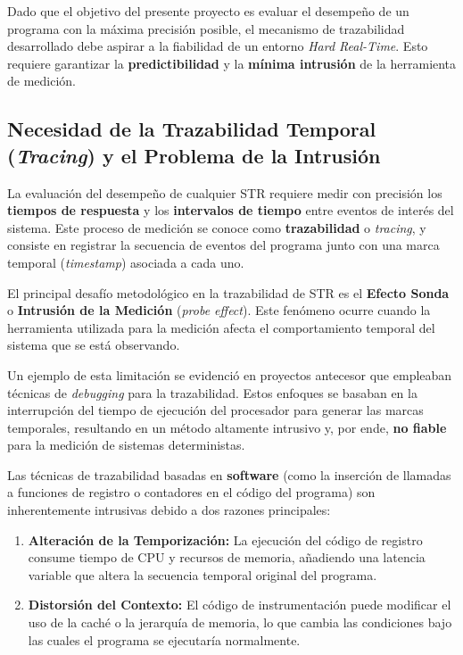 Dado que el objetivo del presente proyecto es evaluar el desempeño de un programa con la máxima precisión posible, el mecanismo de trazabilidad desarrollado debe aspirar a la fiabilidad de un entorno \textit{Hard Real-Time}. Esto requiere garantizar la \textbf{predictibilidad} y la \textbf{mínima intrusión} de la herramienta de medición.


\subsection{Necesidad de la Trazabilidad Temporal (\textit{Tracing}) y el Problema de la Intrusión}
\label{ssec:problema_latencia}

La evaluación del desempeño de cualquier STR requiere medir con precisión los \textbf{tiempos de respuesta} y los \textbf{intervalos de tiempo} entre eventos de interés del sistema. Este proceso de medición se conoce como \textbf{trazabilidad} o \textit{tracing}, y consiste en registrar la secuencia de eventos del programa junto con una marca temporal (\textit{timestamp}) asociada a cada uno.

El principal desafío metodológico en la trazabilidad de STR es el \textbf{Efecto Sonda} o \textbf{Intrusión de la Medición} (\textit{probe effect}). Este fenómeno ocurre cuando la herramienta utilizada para la medición afecta el comportamiento temporal del sistema que se está observando.

Un ejemplo de esta limitación se evidenció en proyectos antecesor que empleaban técnicas de \textit{debugging} para la trazabilidad. Estos enfoques se basaban en la interrupción del tiempo de ejecución del procesador para generar las marcas temporales, resultando en un método altamente intrusivo y, por ende, \textbf{no fiable} para la medición de sistemas deterministas.

Las técnicas de trazabilidad basadas en \textbf{software} (como la inserción de llamadas a funciones de registro o contadores en el código del programa) son inherentemente intrusivas debido a dos razones principales:
\begin{enumerate}
    \item \textbf{Alteración de la Temporización:} La ejecución del código de registro consume tiempo de CPU y recursos de memoria, añadiendo una latencia variable que altera la secuencia temporal original del programa.
    \item \textbf{Distorsión del Contexto:} El código de instrumentación puede modificar el uso de la caché o la jerarquía de memoria, lo que cambia las condiciones bajo las cuales el programa se ejecutaría normalmente.
\end{enumerate}

